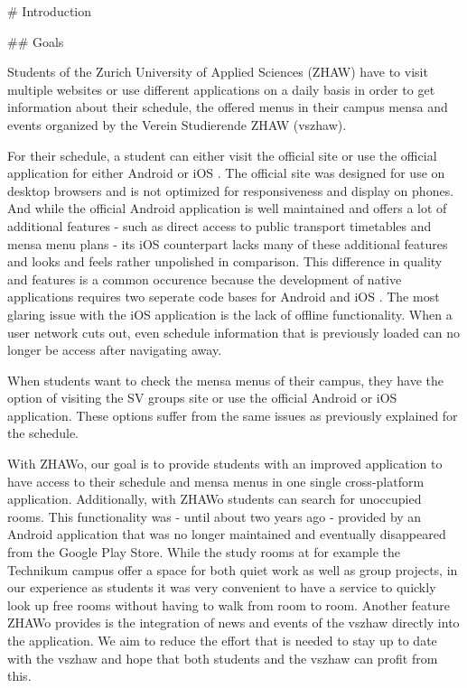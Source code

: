 \begin{markdown}

# Introduction

## Goals

Students of the Zurich University of Applied Sciences (ZHAW) have to visit multiple websites or use different applications on a daily basis in order to get information about their schedule, the offered menus in their campus mensa and events organized by the Verein Studierende ZHAW (vszhaw).

For their schedule, a student can either visit the official site \cite{DUMMY} or use the official application for either Android \cite{DUMMY} or iOS \cite{DUMMY}. The official site was designed for use on desktop browsers and is not optimized for responsiveness and display on phones. And while the official Android application is well maintained and offers a lot of additional features - such as direct access to public transport timetables and mensa menu plans - its iOS counterpart lacks many of these additional features and looks and feels rather unpolished in comparison. This difference in quality and features is a common occurence because the development of native applications requires two seperate code bases for Android and iOS \cite{DUMMY}. The most glaring issue with the iOS application is the lack of offline functionality. When a user network cuts out, even schedule information that is previously loaded can no longer be access after navigating away.

When students want to check the mensa menus of their campus, they have the option of visiting the SV groups site or use the official Android or iOS application. These options suffer from the same issues as previously explained for the schedule.

With ZHAWo, our goal is to provide students with an improved application to have access to their schedule and mensa menus in one single cross-platform application. Additionally, with ZHAWo students can search for unoccupied rooms. This functionality was - until about two years ago - provided by an Android application that was no longer maintained and eventually disappeared from the Google Play Store. While the study rooms at for example the Technikum campus offer a space for both quiet work as well as group projects, in our experience as students it was very convenient to have a service to quickly look up free rooms without having to walk from room to room. Another feature ZHAWo provides is the integration of news and events of the vszhaw directly into the application. We aim to reduce the effort that is needed to stay up to date with the vszhaw and hope that both students and the vszhaw can profit from this.


\end{markdown}
